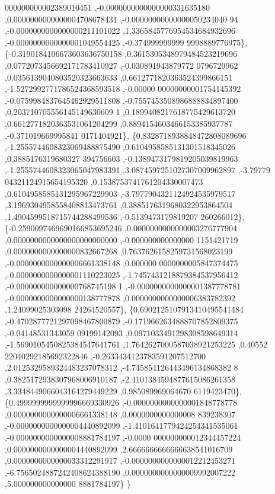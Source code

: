 \begin{DoxyCode}
      000000000002389010451 ,-0.0000000000000000331635180 ,0.0000000000000004708678431 ,-0.00000000000000050234040
      94 ,-0.0000000000000000211101022 ,1.3365845776954534684932696 ,-0.0000000000000001049554425 ,-0.374999999999
      9998889776975\},
\{-0.3190184106673603636750158 ,0.3615305348979484523219696 ,0.0772073456692171783410927 ,-0.030891943879772
      0796729962 ,0.0356139040803520323663633 ,0.6612771820363524399866151 ,-1.5272992771786524368593518 ,-0.00000
      00000000001754145392 ,-0.0759984837645462929511808 ,-0.7557453508986888834897400 ,0.203710705556145149630609
      1 ,0.1899408217618775429613720 ,0.6612771820363531061204299 ,0.8894154603466153385937787 ,-0.371019669995841
      0171404921\},
\{0.8328718938848472808089696 ,-1.2555744608323069488875490 ,0.6104958585131301518345026 ,0.3885176319680327
      394756603 ,-0.1389473179819205039819963 ,-1.2555744608323065047983391 ,3.0874597251027307009962897 ,-3.79779
      04321124915654195320 ,0.1538753741761204330007473 ,0.6104958585131295967229903 ,-3.7977904321124924535979517
       ,3.1969304958558408813473761 ,0.3885176319680322953864504 ,1.4904599518715744288499536 ,-0.5139473179819207
      260266012\},
\{-0.2590097469690166853695246 ,0.0000000000000003276777904 ,0.0000000000000000000000000 ,-0.000000000000000
      1151421719 ,0.0000000000000000832667268 ,0.7637626158259731568023199 ,-0.0000000000000006661338148 ,0.000000
      0000000005847374475 ,-0.0000000000000001110223025 ,-1.7457431218879384537956412 ,-0.000000000000000768745198
      1 ,-0.0000000000000001387778781 ,-0.0000000000000000138777878 ,0.0000000000000006383782392 ,1.24099025303098
      24264520557\},
\{0.6902125107913410495541484 ,-0.4702877721297098467800879 ,-0.1719662634888707852809375 ,-0.04148531343059
      09199142093 ,0.0971033491298308598649314 ,-1.5690105450825384547641761 ,1.7642627000587038921253225 ,0.40552
      22040292185692322846 ,-0.2633434123783591207512700 ,2.0125329589324483237078312 ,-4.745854126443496134868382
      8 ,0.3825172938307968006910187 ,-2.4101384594877615086261358 ,3.3348449066043164279449229 ,0.985089969064670
      6119423470\},
\{0.4999999999999996669330926 ,-0.0000000000000001848778778 ,0.0000000000000006661338148 ,0.0000000000000008
      839238307 ,-0.0000000000000004440892099 ,-1.4101641779424254341535061 ,-0.0000000000000008881784197 ,-0.0000
      000000000012344457224 ,0.0000000000000004440892099 ,2.6666666666666638541016709 ,0.0000000000000033312291917
       ,-0.0000000000000012212453271 ,-6.7565024887242408624388190 ,0.0000000000000009992007222 ,5.000000000000000
      8881784197\}
\}
\end{DoxyCode}
\mbox{\label{a00455_a4687026ab9bf9d432698302ee99ea66b}} 
